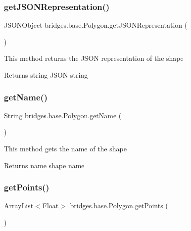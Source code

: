 \subsubsection{\texorpdfstring{get\+J\+S\+O\+N\+Representation()}{getJSONRepresentation()}}
{\footnotesize\ttfamily J\+S\+O\+N\+Object bridges.\+base.\+Polygon.\+get\+J\+S\+O\+N\+Representation (\begin{DoxyParamCaption}{ }\end{DoxyParamCaption})}

This method returns the J\+S\+ON representation of the shape

\begin{DoxyReturn}{Returns}
string J\+S\+ON string 
\end{DoxyReturn}
\mbox{\label{classbridges_1_1base_1_1_polygon_a2203367acb1a26dfa1a81d69ce61274f}} 
\subsubsection{\texorpdfstring{get\+Name()}{getName()}}
{\footnotesize\ttfamily String bridges.\+base.\+Polygon.\+get\+Name (\begin{DoxyParamCaption}{ }\end{DoxyParamCaption})}

This method gets the name of the shape

\begin{DoxyReturn}{Returns}
name shape name 
\end{DoxyReturn}
\mbox{\label{classbridges_1_1base_1_1_polygon_adf81f52211ad3c2c8318461e199b6df5}} 
\subsubsection{\texorpdfstring{get\+Points()}{getPoints()}}
{\footnotesize\ttfamily Array\+List$<$Float$>$ bridges.\+base.\+Polygon.\+get\+Points (\begin{DoxyParamCaption}{ }\end{DoxyParamCaption})}

